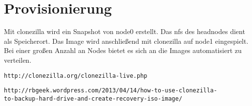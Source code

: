 \chapter{Provisionierung}
Mit clonezilla wird ein Snapshot von node0 erstellt. Das nfs des headnodes dient als Speicherort.
Das Image wird anschließend mit clonezilla auf node1 eingespielt.
Bei einer großen Anzahl an Nodes bietet es sich an die Images automatisiert zu verteilen.
\begin{lstlisting}[style=bash]
http://clonezilla.org/clonezilla-live.php
\end{lstlisting}
\begin{lstlisting}[style=bash]
http://rbgeek.wordpress.com/2013/04/14/how-to-use-clonezilla-
to-backup-hard-drive-and-create-recovery-iso-image/
\end{lstlisting}
